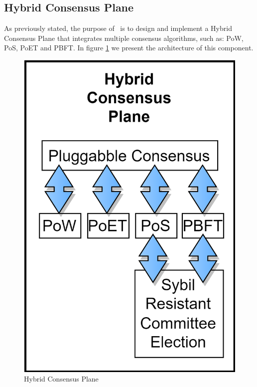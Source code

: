 \subsection{Hybrid Consensus Plane}



As previously stated, the purpose of \mysystem~is to design and implement a Hybrid Consensus Plane that integrates multiple consensus algorithms, such as: \gls{PoW}, \gls{PoS}, \gls{PoET} and \gls{PBFT}. In figure \ref{fig:hyflexchain_consensus} we present the architecture of this component.

\begin{figure}[h]
    \centering
    \includegraphics[scale=0.55]{Chapters/Figures/drawio/hyflexchain/hyflexchain_consensus.png}
    \caption{Hybrid Consensus Plane}
    \label{fig:hyflexchain_consensus}
\end{figure}

